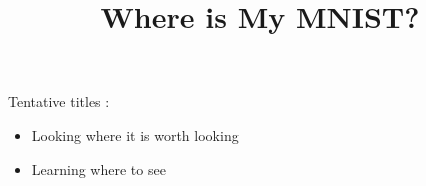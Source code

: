 \documentclass[]{article}
\title{Where is My MNIST?}
\author{}
\begin{document}
\maketitle

Tentative titles :
\begin{itemize}
	\item Looking where it is worth looking
	\item Learning where to see
\end{itemize}

\begin{abstract}

\end{abstract}








\end{document}
